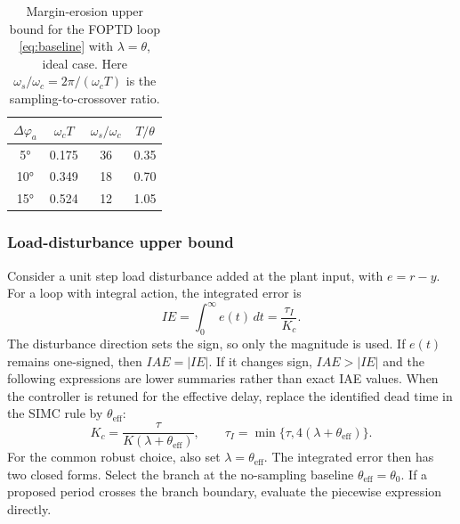 \documentclass[a4paper,fleqn]{cas-sc}
\theoremstyle{remark}
\newcommand{\thetaeff}{\theta_{\mathrm{eff}}}
\newcommand{\wc}{\omega_c}
\begin{document}
\begin{table}[pos=!htb]
\caption{Margin-erosion upper bound for the FOPTD loop
\cref{eq:baseline} with $\lambda=\theta$, ideal case. Here
$\omega_s/\wc=2\pi/(\wc T)$ is the sampling-to-crossover ratio.}
\label{tab:erosion}
\begin{tabular}{cccc}
\toprule
$\Delta\varphi_a$ & $\wc T$ & $\omega_s/\wc$ & $T/\theta$ \\
\midrule
\ang{5}  & 0.175 & 36 & 0.35 \\
\ang{10} & 0.349 & 18 & 0.70 \\
\ang{15} & 0.524 & 12 & 1.05 \\
\bottomrule
\end{tabular}
\end{table}

\subsubsection{Load-disturbance upper bound}
Consider a unit step load disturbance added at the plant input, with $e=r-y$. For a loop with integral action, the integrated error is
\begin{equation}
IE=\int_0^\infty e(t)\,dt=\frac{\tau_I}{K_c}.
\label{eq:ie}
\end{equation}
The disturbance direction sets the sign, so only the magnitude is used. If $e(t)$ remains one-signed, then $IAE=|IE|$. If it changes sign, $IAE>|IE|$ and the following expressions are lower summaries rather than exact IAE values. When the controller is retuned for the effective delay, replace the identified dead time in the SIMC rule by $\thetaeff$:
\[
K_c=\frac{\tau}{K(\lambda+\thetaeff)},\qquad
\tau_I=\min\{\tau,4(\lambda+\thetaeff)\}.
\]
For the common robust choice, also set $\lambda=\thetaeff$. The integrated error then has two closed forms. Select the branch at the no-sampling baseline $\thetaeff=\theta_0$. If a proposed period crosses the branch boundary, evaluate the piecewise expression directly.
\end{document}
